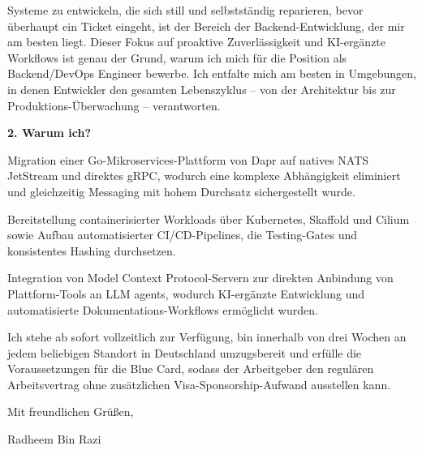 \documentclass[11pt,a4paper]{coverletter}
\begin{document}
Systeme zu entwickeln, die sich still und selbstständig reparieren, bevor überhaupt ein Ticket eingeht, ist der Bereich der Backend-Entwicklung, der mir am besten liegt. Dieser Fokus auf proaktive Zuverlässigkeit und KI-ergänzte Workflows ist genau der Grund, warum ich mich für die Position als Backend/DevOps Engineer bewerbe. Ich entfalte mich am besten in Umgebungen, in denen Entwickler den gesamten Lebenszyklus – von der Architektur bis zur Produktions-Überwachung – verantworten.

\vspace{8pt}\noindent\textbf{2. Warum ich?}\par\vspace{3pt}

\bullets

  \item Migration einer Go-Mikroservices-Plattform von Dapr auf natives NATS JetStream und direktes gRPC, wodurch eine komplexe Abhängigkeit eliminiert und gleichzeitig Messaging mit hohem Durchsatz sichergestellt wurde.

  \item Bereitstellung containerisierter Workloads über Kubernetes, Skaffold und Cilium sowie Aufbau automatisierter CI/CD-Pipelines, die Testing-Gates und konsistentes Hashing durchsetzen.

  \item Integration von Model Context Protocol-Servern zur direkten Anbindung von Plattform-Tools an LLM agents, wodurch KI-ergänzte Entwicklung und automatisierte Dokumentations-Workflows ermöglicht wurden.

\bulletsend

Ich stehe ab sofort vollzeitlich zur Verfügung, bin innerhalb von drei Wochen an jedem beliebigen Standort in Deutschland umzugsbereit und erfülle die Voraussetzungen für die Blue Card, sodass der Arbeitgeber den regulären Arbeitsvertrag ohne zusätzlichen Visa-Sponsorship-Aufwand ausstellen kann.

\closing{Mit freundlichen Grüßen,}{Radheem Bin Razi}
\end{document}
